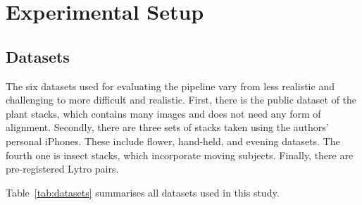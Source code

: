 \documentclass[conference]{IEEEtran}
\begin{document}
\section{Experimental Setup}

\subsection{Datasets}

The six datasets used for evaluating the pipeline vary from less realistic and challenging to more difficult and realistic. First, there is the public dataset of the plant stacks, which contains many images and does not need any form of alignment. Secondly, there are three sets of stacks taken using the authors' personal iPhones. These include flower, hand-held, and evening datasets. The fourth one is insect stacks, which incorporate moving subjects. Finally, there are pre-registered Lytro pairs.

Table~\ref{tab:datasets} summarises all datasets used in this study.

\begin{table}[!ht]
\centering
\caption{Dataset summary.}
\label{tab:datasets}
\end{table}
\end{document}
